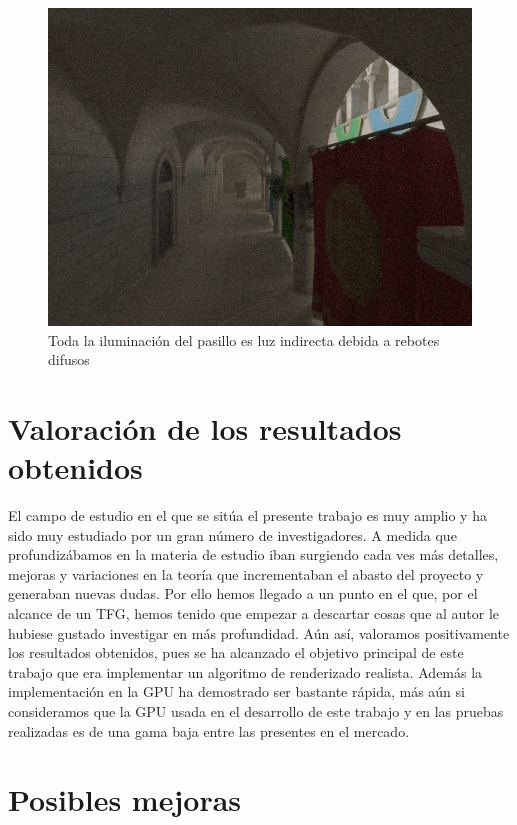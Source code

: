 \clearpage

\begin{figure}
\centering
\includegraphics[width=5in]{indirect.png}
\caption{Toda la iluminación del pasillo es luz indirecta debida a rebotes difusos}
\end{figure}

\clearpage

\section{Valoración de los resultados obtenidos}


El campo de estudio en el que se sitúa el presente trabajo es muy amplio y ha sido muy estudiado por un gran número de investigadores. A medida que profundizábamos en la materia de estudio iban surgiendo cada ves más detalles, mejoras y variaciones en la teoría que incrementaban el abasto del proyecto y generaban nuevas dudas. Por ello hemos llegado a un punto en el que, por el alcance de un TFG, hemos tenido que empezar a descartar cosas que al autor le hubiese gustado investigar en más profundidad. Aún así, valoramos positivamente los resultados obtenidos, pues se ha alcanzado el objetivo principal de este trabajo que era implementar un algoritmo de renderizado realista. Además la implementación en la GPU ha demostrado ser bastante rápida, más aún si consideramos que la GPU usada en el desarrollo de este trabajo y en las pruebas realizadas es de una gama baja entre las presentes en el mercado.

\clearpage

\section{Posibles mejoras}

